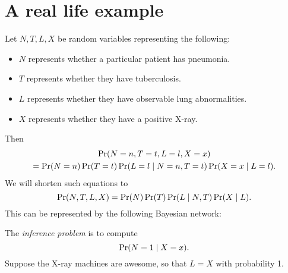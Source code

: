 \section{A real life example} \label{sec:bayes_networks:eg}
Let $N, T, L, X$ be random variables representing the following:
\begin{itemize}
    \item $N$ represents whether a particular patient has pneumonia.
    \item $T$ represents whether they have tuberculosis.
    \item $L$ represents whether they have observable lung abnormalities.
    \item $X$ represents whether they have a positive X-ray.
\end{itemize}
Then \begin{multline*}
    \Pr(N = n, T = t, L = l, X = x) \\
        = \Pr(N = n) \Pr(T = t)
        \Pr(L = l \mid N = n, T = t)
        \Pr(X = x \mid L = l).
\end{multline*} We will shorten such equations to \[
    \Pr(N, T, L, X) = \Pr(N) \Pr(T) \Pr(L \mid N, T) \Pr(X \mid L).
\] This can be represented by the following Bayesian network:
\begin{center}
\end{center}
The \emph{inference problem} is to compute \[
    \Pr(N = 1 \mid X = x).
\] Suppose the X-ray machines are awesome, so that $L=X$ with probability 1.

